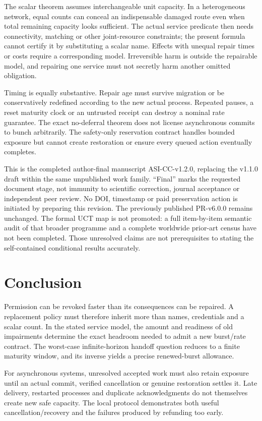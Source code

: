 The scalar theorem assumes interchangeable unit capacity. In a heterogeneous network, equal counts can conceal an indispensable damaged route even when total remaining capacity looks sufficient. The actual service predicate then needs connectivity, matching or other joint-resource constraints; the present formula cannot certify it by substituting a scalar name. Effects with unequal repair times or costs require a corresponding model. Irreversible harm is outside the repairable model, and repairing one service must not secretly harm another omitted obligation.

Timing is equally substantive. Repair age must survive migration or be conservatively redefined according to the new actual process. Repeated pauses, a reset maturity clock or an untrusted receipt can destroy a nominal rate guarantee. The exact no-deferral theorem does not license asynchronous commits to bunch arbitrarily. The safety-only reservation contract handles bounded exposure but cannot create restoration or ensure every queued action eventually completes.

This is the completed author-final manuscript ASI-CC-v1.2.0, replacing the v1.1.0 draft within the same unpublished work family. ``Final'' marks the requested document stage, not immunity to scientific correction, journal acceptance or independent peer review. No DOI, timestamp or paid preservation action is initiated by preparing this revision. The previously published PR-v6.0.0 remains unchanged. The formal UCT map is not promoted: a full item-by-item semantic audit of that broader programme and a complete worldwide prior-art census have not been completed. Those unresolved claims are not prerequisites to stating the self-contained conditional results accurately.

\section{Conclusion}
Permission can be revoked faster than its consequences can be repaired. A replacement policy must therefore inherit more than names, credentials and a scalar count. In the stated service model, the amount and readiness of old impairments determine the exact headroom needed to admit a new burst/rate contract. The worst-case infinite-horizon handoff question reduces to a finite maturity window, and its inverse yields a precise renewed-burst allowance.

For asynchronous systems, unresolved accepted work must also retain exposure until an actual commit, verified cancellation or genuine restoration settles it. Late delivery, restarted processes and duplicate acknowledgments do not themselves create new safe capacity. The local protocol demonstrates both useful cancellation/recovery and the failures produced by refunding too early.

